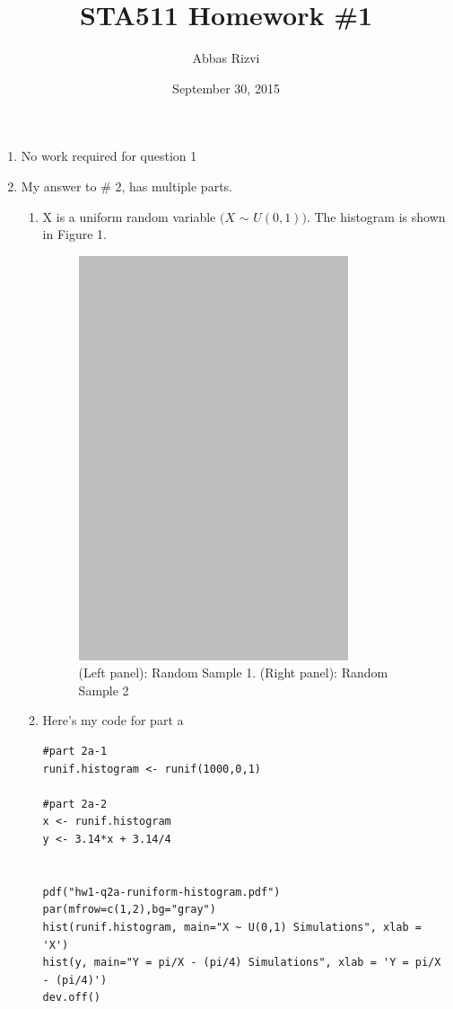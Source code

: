 \documentclass[letterpaper]{article}
\begin{document}
\title{STA511 Homework \#1}
\date{September 30, 2015}
\author{Abbas Rizvi}
\maketitle

\begin{enumerate}

\item No work required for question 1

\item My answer to \# 2, has multiple parts.

\begin{enumerate}
\item X is a uniform random variable $(X$ $\sim$ $U(0,1))$. The histogram is shown in Figure 1.
\begin{figure}[htpb]
\centering
\caption{(Left panel): Random Sample 1. (Right panel): Random Sample 2 }
\centering
\includegraphics[scale=0.6]{hw1-q2a-runiform-histogram.pdf}
\end{figure}

\item Here's my code for part a
\begin{verbatim}
#part 2a-1
runif.histogram <- runif(1000,0,1)

#part 2a-2
x <- runif.histogram
y <- 3.14*x + 3.14/4


pdf("hw1-q2a-runiform-histogram.pdf")
par(mfrow=c(1,2),bg="gray")
hist(runif.histogram, main="X ~ U(0,1) Simulations", xlab = 'X')
hist(y, main="Y = pi/X - (pi/4) Simulations", xlab = 'Y = pi/X - (pi/4)')
dev.off()
\end{verbatim}


\end{enumerate}
\end{enumerate}
\end{document}

